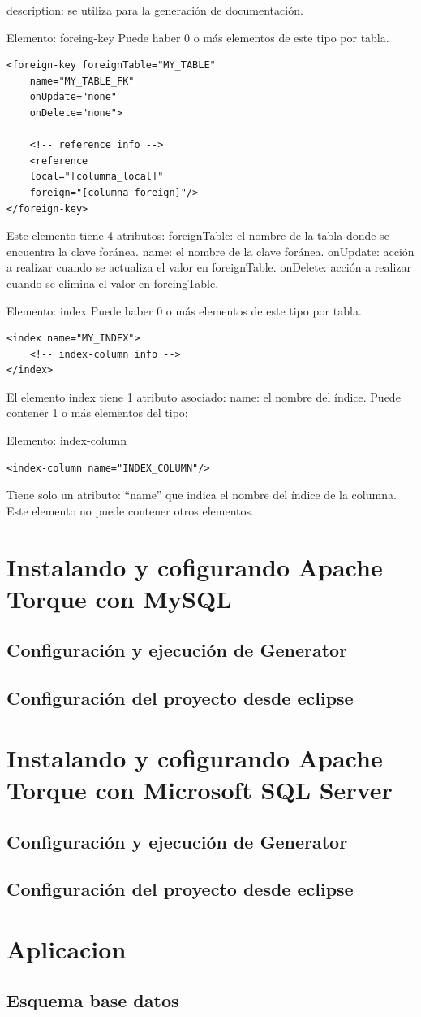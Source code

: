 \documentclass[12pt, oneside]{article}
\begin{document}
description: se utiliza para la generación de documentación.


Elemento: foreing-key
Puede haber 0 o más elementos de este tipo por tabla.

\begin{lstlisting}
<foreign-key foreignTable="MY_TABLE"
	name="MY_TABLE_FK"
	onUpdate="none"
	onDelete="none">
	
	<!-- reference info -->
	<reference
	local="[columna_local]"
	foreign="[columna_foreign]"/>
</foreign-key>
\end{lstlisting}

Este elemento tiene 4 atributos:
foreignTable: el nombre de la tabla donde se encuentra la clave foránea.
name: el nombre de la clave foránea.
onUpdate: acción a realizar cuando se actualiza el valor en foreignTable.
onDelete: acción a realizar cuando se elimina el valor en foreingTable.

Elemento: index
Puede haber 0 o más elementos de este tipo por tabla.

\begin{lstlisting}
<index name="MY_INDEX">
	<!-- index-column info -->
</index>
\end{lstlisting}

El elemento index tiene 1 atributo asociado:
name: el nombre del índice. 
Puede contener 1 o más elementos  del tipo:
	
Elemento: index-column

\begin{lstlisting}
<index-column name="INDEX_COLUMN"/>
\end{lstlisting}

Tiene solo un atributo: “name” que indica el nombre del índice de la columna. Este elemento no puede contener otros elementos.

\section{Instalando y cofigurando Apache Torque con MySQL}
\subsection{Configuración y ejecución de Generator}
\subsection{Configuración del proyecto desde eclipse}

\section{Instalando y cofigurando Apache Torque con Microsoft SQL Server}
\subsection{Configuración y ejecución de Generator}
\subsection{Configuración del proyecto desde eclipse}

\section{Aplicacion}
\subsection{Esquema base datos}

\end{document}
